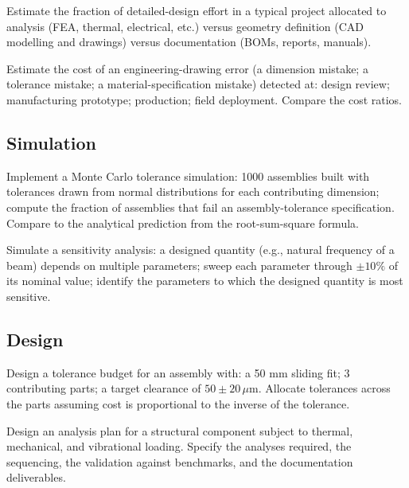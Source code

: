 \begin{exercise}
Estimate the fraction of detailed-design effort in a typical project allocated to analysis (FEA, thermal, electrical, etc.) versus geometry definition (CAD modelling and drawings) versus documentation (BOMs, reports, manuals).
\end{exercise}

\begin{exercise}
Estimate the cost of an engineering-drawing error (a dimension mistake; a tolerance mistake; a material-specification mistake) detected at: design review; manufacturing prototype; production; field deployment. Compare the cost ratios.
\end{exercise}

\subsection*{Simulation}

\begin{exercise}
Implement a Monte Carlo tolerance simulation: 1000 assemblies built with tolerances drawn from normal distributions for each contributing dimension; compute the fraction of assemblies that fail an assembly-tolerance specification. Compare to the analytical prediction from the root-sum-square formula.
\end{exercise}

\begin{exercise}
Simulate a sensitivity analysis: a designed quantity (e.g., natural frequency of a beam) depends on multiple parameters; sweep each parameter through $\pm 10\%$ of its nominal value; identify the parameters to which the designed quantity is most sensitive.
\end{exercise}

\subsection*{Design}

\begin{exercise}
Design a tolerance budget for an assembly with: a 50 mm sliding fit; 3 contributing parts; a target clearance of $50 \pm 20\,\mu\text{m}$. Allocate tolerances across the parts assuming cost is proportional to the inverse of the tolerance.
\end{exercise}

\begin{exercise}
Design an analysis plan for a structural component subject to thermal, mechanical, and vibrational loading. Specify the analyses required, the sequencing, the validation against benchmarks, and the documentation deliverables.
\end{exercise}

